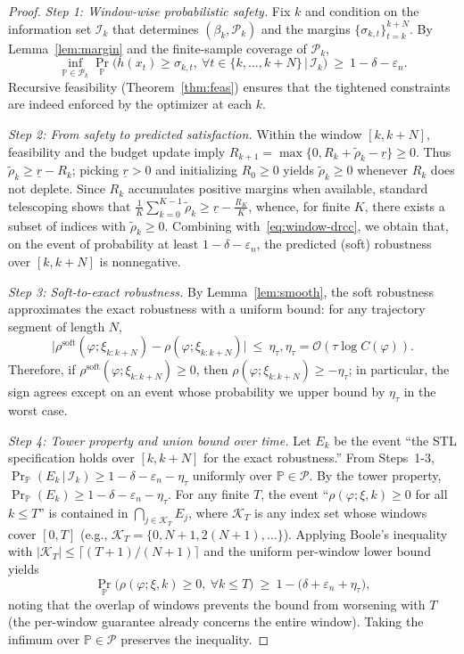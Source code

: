 \documentclass[journal]{IEEEtran}
\theoremstyle{definition}
\begin{document}
\begin{proof}
\textit{Step 1: Window-wise probabilistic safety.}
Fix $k$ and condition on the information set $\mathcal{I}_k$ that determines
$(\beta_k,\mathcal{P}_k)$ and the margins $\{\sigma_{k,t}\}_{t=k}^{k+N}$.
By Lemma~\ref{lem:margin} and the finite-sample coverage of $\mathcal{P}_k$,
\begin{equation}
\inf_{\mathbb{P}\in\mathcal{P}_k}
\Pr_{\mathbb{P}}\!\Big(h(x_t)\ge \sigma_{k,t},\ \forall t\in\{k,\dots,k+N\}\,\Big|\,\mathcal{I}_k\Big)
\ \ge\ 1-\delta-\varepsilon_n.
\label{eq:window-drcc}
\end{equation}
Recursive feasibility (Theorem~\ref{thm:feas}) ensures that the tightened constraints are
indeed enforced by the optimizer at each $k$.

\textit{Step 2: From safety to predicted satisfaction.}
Within the window $[k,k+N]$, feasibility and the budget update imply
$R_{k+1}=\max\{0,R_k+\widetilde\rho_k-\underline r\}\ge 0$.
Thus $\widetilde\rho_k\ge \underline r - R_k$; picking $\underline r>0$ and initializing
$R_0\ge 0$ yields $\widetilde\rho_k\ge 0$ whenever $R_k$ does not deplete.
Since $R_k$ accumulates positive margins when available, standard telescoping shows that
$\frac{1}{K}\sum_{k=0}^{K-1}\widetilde\rho_k \ge \underline r - \frac{R_K}{K}$, whence, for finite $K$,
there exists a subset of indices with $\widetilde\rho_k\ge 0$.
Combining with~\eqref{eq:window-drcc}, we obtain that, on the event of probability at least
$1-\delta-\varepsilon_n$, the predicted (soft) robustness over $[k,k+N]$ is nonnegative.

\textit{Step 3: Soft-to-exact robustness.}
By Lemma~\ref{lem:smooth}, the soft robustness approximates the exact robustness with
a uniform bound: for any trajectory segment of length $N$,
\[
\big|\rho^{\mathrm{soft}}(\varphi;\xi_{k:k+N}) - \rho(\varphi;\xi_{k:k+N})\big|
\ \le\ \eta_\tau, \eta_\tau=\mathcal{O}(\tau\log C(\varphi)).
\]
Therefore, if $\rho^{\mathrm{soft}}(\varphi;\xi_{k:k+N})\ge 0$, then
$\rho(\varphi;\xi_{k:k+N})\ge -\eta_\tau$; in particular, the sign agrees except on an
event whose probability we upper bound by $\eta_\tau$ in the worst case.

\textit{Step 4: Tower property and union bound over time.}
Let $E_k$ be the event ``the STL specification holds over $[k,k+N]$ for the exact robustness.''
From Steps~1-3,
$\Pr_{\mathbb{P}}(E_k\,|\,\mathcal{I}_k)\ge 1-\delta-\varepsilon_n-\eta_\tau$ uniformly over
$\mathbb{P}\in\mathcal{P}$. By the tower property,
$\Pr_{\mathbb{P}}(E_k)\ge 1-\delta-\varepsilon_n-\eta_\tau$.
For any finite $T$, the event ``$\rho(\varphi;\xi,k)\ge 0$ for all $k\le T$'' is contained in
$\bigcap_{j\in\mathcal{K}_T} E_j$, where $\mathcal{K}_T$ is any index set whose windows
cover $[0,T]$ (e.g., $\mathcal{K}_T=\{0,N{+}1,2(N{+}1),\dots\}$).
Applying Boole's inequality with $|\mathcal{K}_T|\le \lceil (T{+}1)/(N{+}1)\rceil$ and the
uniform per-window lower bound yields
\[
\Pr_{\mathbb{P}}\!\Big(\rho(\varphi;\xi,k)\ge 0,\ \forall k\le T\Big)
\ \ge\ 1- \big(\delta+\varepsilon_n+\eta_\tau\big),
\]
noting that the overlap of windows prevents the bound from worsening with $T$
(the per-window guarantee already concerns the entire window).
Taking the infimum over $\mathbb{P}\in\mathcal{P}$ preserves the inequality.


\end{proof}
\end{document}
